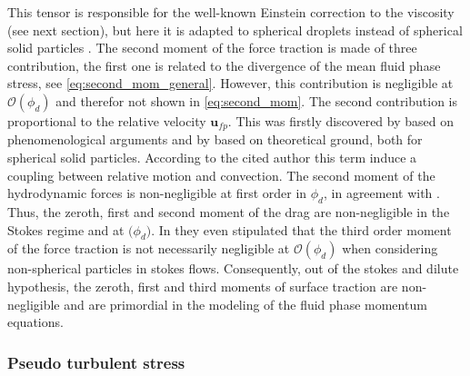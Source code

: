This tensor is responsible for the well-known Einstein correction to the viscosity (see next section), but here it is adapted to spherical droplets instead of spherical solid particles \citep{rallison1978note}. 
The second moment of the force traction is made of three contribution, the first one is related to the divergence of the mean fluid phase stress, see \ref{eq:second_mom_general}. 
However, this contribution is negligible at $\mathcal{O}(\phi_d)$ \citep{jackson1997locally} and therefor not shown in \ref{eq:second_mom}.  
The second contribution is proportional to the relative velocity $\textbf{u}_{fp}$.
This was firstly discovered by \citet{nozieres1987local} based on phenomenological arguments and by \citet{lhuillier1992volume} based on theoretical ground, both for spherical solid particles. 
According to the cited author this term induce a coupling between relative motion and convection. 
The second moment of the hydrodynamic forces is non-negligible at first order in $\phi_d$, in agreement with \citep{jackson1997locally,zhang1997momentum}. 
Thus, the zeroth, first and second moment of the drag are non-negligible in the Stokes regime and at $\mathcal(\phi_d)$. 
In \citet{zhang1997momentum} they even stipulated that the third order moment of the force traction is not necessarily negligible at $\mathcal{O}(\phi_d)$ when considering non-spherical particles in stokes flows. 
Consequently, out of the stokes and dilute hypothesis, the zeroth, first and third moments of surface traction are non-negligible and are primordial in the modeling of the fluid phase momentum equations. 

\subsubsection{Pseudo turbulent stress}

